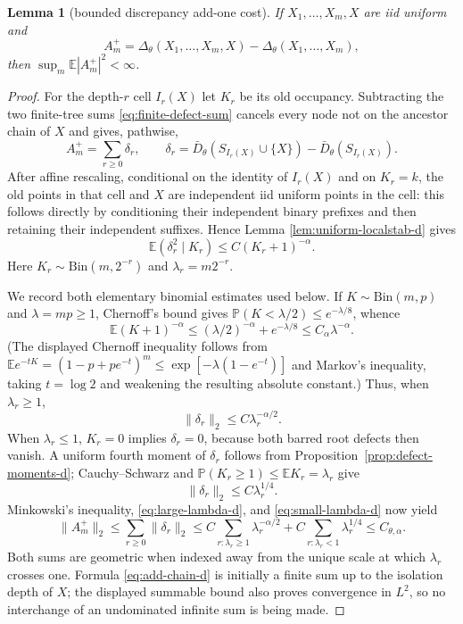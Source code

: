\documentclass[11pt]{article}
\numberwithin{equation}{section}
\newtheorem{lemma}[theorem]{Lemma}
\newcommand{\1}{\mathbf 1}\newcommand{\F}{\mathcal F}\newcommand{\D}{\mathcal D}
\begin{document}
\begin{lemma}[bounded discrepancy add-one cost]\label{lem:delta-addone-d}
If $X_1,\ldots,X_m,X$ are iid uniform and
\[
 A_m^+=\Delta_\theta(X_1,\ldots,X_m,X)
       -\Delta_\theta(X_1,\ldots,X_m),
\]
then $\sup_m\mathbb E|A_m^+|^2<\infty$.
\end{lemma}
\begin{proof}
For the depth-$r$ cell $I_r(X)$ let $K_r$ be its old occupancy.  Subtracting
the two finite-tree sums \eqref{eq:finite-defect-sum} cancels every node not
on the ancestor chain of $X$ and gives, pathwise,
\begin{equation}
 A_m^+=\sum_{r\ge0}\delta_r,\qquad
 \delta_r=\bar D_\theta(S_{I_r(X)}\cup\{X\})
             -\bar D_\theta(S_{I_r(X)}).                     \label{eq:add-chain-d}
\end{equation}
After affine rescaling, conditional on the identity of $I_r(X)$ and on
$K_r=k$, the old points in that cell and $X$ are independent iid uniform
points in the cell: this follows directly by conditioning their independent
binary prefixes and then retaining their independent suffixes.  Hence Lemma
\ref{lem:uniform-localstab-d} gives
\begin{equation}
 \mathbb E(\delta_r^2\mid K_r)\le C(K_r+1)^{-\alpha}.        \label{eq:delta-large-d}
\end{equation}
Here $K_r\sim\mathrm{Bin}(m,2^{-r})$ and $\lambda_r=m2^{-r}$.

We record both elementary binomial estimates used below.  If $K\sim
\mathrm{Bin}(m,p)$ and $\lambda=mp\ge1$, Chernoff's bound gives
$\mathbb P(K<\lambda/2)\le e^{-\lambda/8}$, whence
\[
 \mathbb E(K+1)^{-\alpha}
 \le(\lambda/2)^{-\alpha}+e^{-\lambda/8}\le C_\alpha\lambda^{-\alpha}.
\]
(The displayed Chernoff inequality follows from
$\mathbb Ee^{-tK}=(1-p+pe^{-t})^m\le
\exp[-\lambda(1-e^{-t})]$ and Markov's inequality, taking $t=\log2$ and
weakening the resulting absolute constant.)  Thus, when $\lambda_r\ge1$,
\begin{equation}\|\delta_r\|_2\le C\lambda_r^{-\alpha/2}.     \label{eq:large-lambda-d}\end{equation}
When $\lambda_r\le1$, $K_r=0$ implies $\delta_r=0$, because both barred
root defects then vanish.  A uniform fourth moment of $\delta_r$ follows
from Proposition~\ref{prop:defect-moments-d}; Cauchy--Schwarz and
$\mathbb P(K_r\ge1)\le\mathbb EK_r=\lambda_r$ give
\begin{equation}\|\delta_r\|_2\le C\lambda_r^{1/4}.           \label{eq:small-lambda-d}\end{equation}
Minkowski's inequality, \eqref{eq:large-lambda-d}, and
\eqref{eq:small-lambda-d} now yield
\[
 \|A_m^+\|_2\le\sum_{r\ge0}\|\delta_r\|_2
 \le C\sum_{r:\lambda_r\ge1}\lambda_r^{-\alpha/2}
      +C\sum_{r:\lambda_r<1}\lambda_r^{1/4}\le C_{\theta,\alpha}.
\]
Both sums are geometric when indexed away from the unique scale at which
$\lambda_r$ crosses one.  Formula \eqref{eq:add-chain-d} is initially a
finite sum up to the isolation depth of $X$; the displayed summable bound
also proves convergence in $L^2$, so no interchange of an undominated
infinite sum is being made.
\end{proof}
\end{document}
